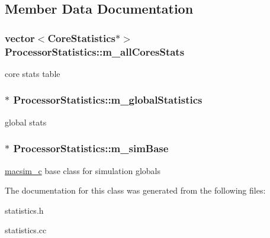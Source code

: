 \subsection{Member Data Documentation}
\hypertarget{classProcessorStatistics_aebf8d458721e8dae44eb6553f63e8bd3}{
\subsubsection[{m\_\-allCoresStats}]{\setlength{\rightskip}{0pt plus 5cm}vector$<${\bf CoreStatistics}$\ast$$>$ {\bf ProcessorStatistics::m\_\-allCoresStats}}}
\label{classProcessorStatistics_aebf8d458721e8dae44eb6553f63e8bd3}
core stats table \hypertarget{classProcessorStatistics_ab7c416dfed4f35806c7c0ab940eb13e3}{
\subsubsection[{m\_\-globalStatistics}]{$\ast$ {\bf ProcessorStatistics::m\_\-globalStatistics}}}
\label{classProcessorStatistics_ab7c416dfed4f35806c7c0ab940eb13e3}
global stats \hypertarget{classProcessorStatistics_a8578cc09c367d3be975d814322d97f5b}{
\subsubsection[{m\_\-simBase}]{$\ast$ {\bf ProcessorStatistics::m\_\-simBase}}}
\label{classProcessorStatistics_a8578cc09c367d3be975d814322d97f5b}
\hyperlink{classmacsim__c}{macsim\_\-c} base class for simulation globals 

The documentation for this class was generated from the following files:\begin{DoxyCompactItemize}
\item 
statistics.h\item 
statistics.cc\end{DoxyCompactItemize}
